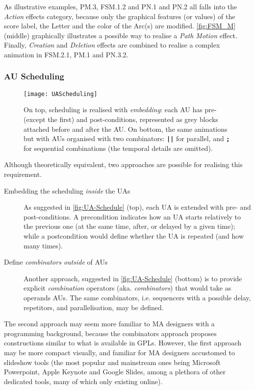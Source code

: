As illustrative examples, \textsf{PM.3}, \textsf{FSM.1.2} and \textsf{PN.1} and \textsf{PN.2}
all falls into the \emph{Action} effects category, because only the graphical 
features (or values) of the score label, the \textsf{Letter} and the color of the
\textsf{Arc}(s) are modified. \autoref{fig:FSM_M} (middle) graphically illustrates
a possible way to realise a \emph{Path Motion} effect. Finally,
\emph{Creation} and \emph{Deletion} effects are combined to realise a complex 
animation in \textsf{FSM.2.1}, \textsf{PM.1} and \textsf{PN.3.2}. 

\subsubsection{AU Scheduling}
\label{sec:MA-Scheduling}

\begin{figure}[t]%
   \centering
   \texttt{[image: UAScheduling]}%
   \caption{On top, scheduling is realised with \emph{embedding}: each AU has 
   pre- (except the first) and post-conditions, represented as grey blocks attached 
   before and after the AU. On bottom, the same animations but with AUs organised with
   two combinators: \texttt{\textbf{||}} for parallel, and \texttt{\textbf{;}} for
   sequential combinations (the temporal details are omitted).
   }%
   \label{fig:UA-Schedule}%
\end{figure}

Although theoretically equivalent, two approaches are possible for realising
this requirement.
\begin{description}
   \item[Embedding the scheduling \emph{inside} the UAs] As suggested in 
   \autoref{fig:UA-Schedule} (top), each UA is extended with pre- and 
   post-conditions. A precondition indicates how an UA starts relatively to the 
   previous one (at the same time, after, or delayed by a given time); while a
   postcondition would define whether the UA is repeated (and how many times).
   
   \item[Define \emph{combinators outside} of AUs] Another approach, suggested
   in \autoref{fig:UA-Schedule} (bottom) is to provide explicit \emph{combination}
   operators (aka. \emph{combinators}) that would take as operands AUs. The same
   combinators, i.e. sequencers with a possible delay, repetitors, and 
   parallelisation, may be defined.
\end{description}
The second approach may seem more familiar to MA designers with a programming 
background, because the combinators approach proposes constructions similar to
what is available in GPLs. However, the first approach may be more compact visually,
and familiar for MA designers accustomed to slideshow tools (the most popular and
mainstream ones being Microsoft Powerpoint, Apple Keynote and Google Slides, among
a plethora of other dedicated tools, many of which only existing online).

